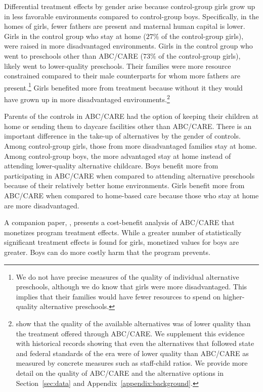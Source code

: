 Differential treatment effects by gender arise because control-group girls grow up in less favorable environments compared to control-group boys. Specifically, in the homes of girls, fewer fathers are present and maternal human capital is lower. Girls in the control group who stay at home ($27\%$ of the control-group girls), were raised in more disadvantaged environments. Girls in the control group who went to preschools other than ABC/CARE ($73\%$ of the control-group girls), likely went to lower-quality preschools. Their families were more resource constrained compared to their male counterparts for whom more fathers are present.\footnote{We do not have precise measures of the quality of individual alternative preschools, although we do know that girls were more disadvantaged. This implies that their families would have fewer resources to spend on higher-quality alternative preschools.} Girls benefited more from treatment because without it they would have grown up in more disadvantaged environments.\footnote{\citet{Burchinal_etal_1989_CD_Daycare-Pre-K-Dev} show that the quality of the available alternatives was of lower quality than the treatment offered through ABC/CARE. We supplement this evidence with historical records showing that even the alternatives that followed state and federal standards of the era were of lower quality than ABC/CARE as measured by concrete measures such as staff-child ratios. We provide more detail on the quality of ABC/CARE and the alternative options in Section~\ref{sec:data} and Appendix~\ref{appendix:background}.}

Parents of the controls in ABC/CARE had the option of keeping their children at home or sending them to daycare facilities other than ABC/CARE. There is an important difference in the take-up of alternatives by the gender of controls. Among control-group girls, those from more disadvantaged families stay at home. Among control-group boys, the more advantaged stay at home instead of attending lower-quality alternative childcare. Boys benefit more from participating in ABC/CARE when compared to attending alternative preschools because of their relatively better home environments. Girls benefit more from ABC/CARE when compared to home-based care because those who stay at home are more disadvantaged.

A companion paper, \citet{Garcia_Heckman_Leaf_etal_2017_Comp_CBA_Unpublished}, presents a cost-benefit analysis of ABC/CARE that monetizes program treatment effects. While a greater number of statistically significant treatment effects is found for girls, monetized values for boys are greater. Boys can do more costly harm that the program prevents.

